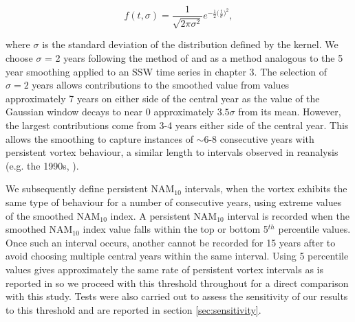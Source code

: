 \begin{equation} \label{Gaussian_filter}
f(t, \sigma) = \frac{1}{\sqrt{2 \pi \sigma^2}} e^{-\frac{1}{2}\big(\frac{t}{\sigma}\big)^2},
\end{equation}

\noindent where $\sigma$ is the standard deviation of the distribution defined by the kernel. We choose $\sigma$ = 2 years following the method of \cite{reichlerStratospheric2012b} and as a method analogous to the 5 year smoothing applied to an SSW time series in chapter 3. The selection of $\sigma = 2$ years allows contributions to the smoothed value from values approximately 7 years on either side of the central year as the value of the Gaussian window decays to near 0 approximately $3.5\sigma$ from its mean. However, the largest contributions come from 3-4 years either side of the central year. This allows the smoothing to capture instances of $\sim$6-8 consecutive years with persistent vortex behaviour, a similar length to intervals observed in reanalysis (e.g. the 1990s, \cite{pawsonCold1999b}). 

We subsequently define persistent NAM$_{10}$ intervals, when the vortex exhibits the same type of behaviour for a number of consecutive years, using extreme values of the smoothed NAM$_{10}$ index. A persistent NAM$_{10}$ interval is recorded when the smoothed NAM$_{10}$ index value falls within the top or bottom 5$^{th}$ percentile values. Once such an interval occurs, another cannot be recorded for 15 years after to avoid choosing multiple central years within the same interval. Using 5 percentile values gives approximately the same rate of persistent vortex intervals as is reported in \cite{reichlerStratospheric2012b} so we proceed with this threshold throughout for a direct comparison with this study. Tests were also carried out to assess the sensitivity of our results to this threshold and are reported in section \ref{sec:sensitivity}.

